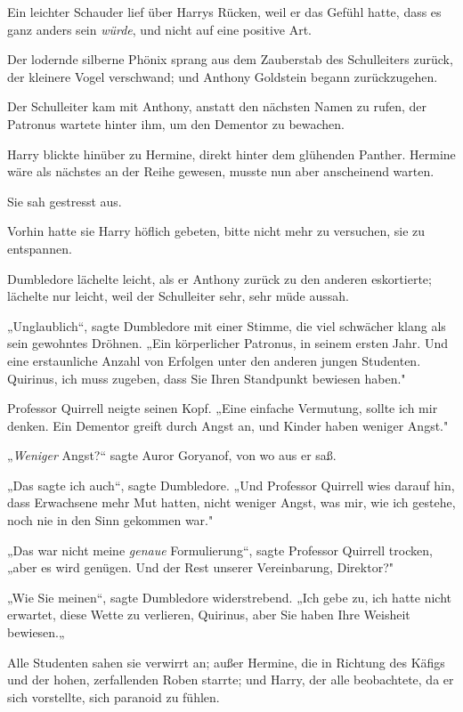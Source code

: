 {Ein leichter Schauder lief über Harrys Rücken, weil er das Gefühl hatte, dass es ganz anders sein \emph{würde}, und nicht auf eine positive Art.

Der lodernde silberne Phönix sprang aus dem Zauberstab des Schulleiters zurück, der kleinere Vogel verschwand; und Anthony Goldstein begann zurückzugehen.

Der Schulleiter kam mit Anthony, anstatt den nächsten Namen zu rufen, der Patronus wartete hinter ihm, um den Dementor zu bewachen.

Harry blickte hinüber zu Hermine, direkt hinter dem glühenden Panther. Hermine wäre als nächstes an der Reihe gewesen, musste nun aber anscheinend warten.

Sie sah gestresst aus.

Vorhin hatte sie Harry höflich gebeten, bitte nicht mehr zu versuchen, sie zu entspannen.

Dumbledore lächelte leicht, als er Anthony zurück zu den anderen eskortierte; lächelte nur leicht, weil der Schulleiter sehr, sehr müde aussah.

„Unglaublich“, sagte Dumbledore mit einer Stimme, die viel schwächer klang als sein gewohntes Dröhnen. „Ein körperlicher Patronus, in seinem ersten Jahr. Und eine erstaunliche Anzahl von Erfolgen unter den anderen jungen Studenten. Quirinus, ich muss zugeben, dass Sie Ihren Standpunkt bewiesen haben."

Professor Quirrell neigte seinen Kopf. „Eine einfache Vermutung, sollte ich mir denken. Ein Dementor greift durch Angst an, und Kinder haben weniger Angst."

„\emph{Weniger} Angst?“ sagte Auror Goryanof, von wo aus er saß.

„Das sagte ich auch“, sagte Dumbledore. „Und Professor Quirrell wies darauf hin, dass Erwachsene mehr Mut hatten, nicht weniger Angst, was mir, wie ich gestehe, noch nie in den Sinn gekommen war."

„Das war nicht meine \emph{genaue} Formulierung“, sagte Professor Quirrell trocken, „aber es wird genügen. Und der Rest unserer Vereinbarung, Direktor?"

„Wie Sie meinen“, sagte Dumbledore widerstrebend. „Ich gebe zu, ich hatte nicht erwartet, diese Wette zu verlieren, Quirinus, aber Sie haben Ihre Weisheit bewiesen.„

Alle Studenten sahen sie verwirrt an; außer Hermine, die in Richtung des Käfigs und der hohen, zerfallenden Roben starrte; und Harry, der alle beobachtete, da er sich vorstellte, sich paranoid zu fühlen.

}
